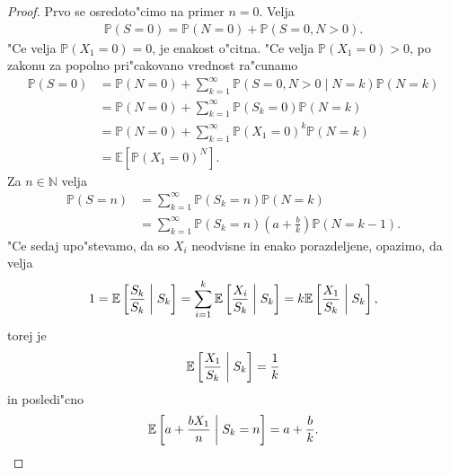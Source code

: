 \documentclass[12pt, a4paper, reqno]{amsart}
\theoremstyle{definition}
\theoremstyle{plain}
\newcommand{\N}{\mathbb{N}}
\newcommand{\E}{\mathbb{E}}
\newcommand{\Prob}{\mathbb{P}}
\newcommand{\1}{\mathds{1}}
\begin{document}
    \begin{proof}
        Prvo se osredoto"cimo na primer $n = 0$. Velja
        \begin{align*}
            \Prob\left(S = 0\right)     
                = \Prob\left(N = 0\right) + \Prob\left(S = 0, N > 0\right).
        \end{align*}
        "Ce velja $\Prob(X_1 = 0) = 0$, je enakost o"citna. "Ce 
        velja $\Prob(X_1 = 0) > 0$, po zakonu za popolno pri"cakovano vrednost ra"cunamo
        \begin{align*}
            \Prob\left(S = 0\right) 
                &= \Prob\left(N = 0\right) + \sum_{k = 1}^\infty\Prob\left(S = 0, N > 0 \mid N = k\right)\Prob\left(N = k\right) \\
                &= \Prob\left(N = 0\right) + \sum_{k = 1}^\infty\Prob\left(S_k = 0\right)\Prob\left(N = k\right) \\
                &= \Prob\left(N = 0\right) + \sum_{k = 1}^\infty\Prob\left(X_1 = 0\right)^k\Prob\left(N = k\right) \\
                &= \E\left[\Prob\left(X_1 = 0\right)^N\right].
        \end{align*}
        Za $n\in\N$ velja
        \begin{align}
            \Prob\left(S = n\right) 
                &= \sum_{k = 1}^\infty\Prob\left(S_k = n\right)\Prob\left(N = k\right) \nonumber \\
                &= \sum_{k = 1}^\infty\Prob\left(S_k = n\right)\left(a + \frac{b}{k}\right)\Prob\left(N = k - 1\right). \label{eq:PanjerRecursionSchemeProof}
        \end{align}
        "Ce sedaj upo"stevamo, da so $X_i$ neodvisne in enako porazdeljene, opazimo, da velja
        \begin{equation*}
            1 = \E\left[\frac{S_k}{S_k} \biggm|  S_k\right] = \sum_{i = 1}^k\E\left[\frac{X_i}{S_k} \biggm|  S_k\right] = k\E\left[\frac{X_1}{S_k} \biggm|  S_k\right],
        \end{equation*}
        torej je 
        \begin{equation*}
            \E\left[\frac{X_1}{S_k}  \biggm|  S_k\right] = \frac{1}{k}
        \end{equation*}
        in posledi"cno 
        \begin{equation}
            \E\left[a + \frac{bX_1}{n} \biggm|   S_k = n\right] = a + \frac{b}{k}.
            \label{eq:PanjerRecursionSchemeProof2}
        \end{equation}         

\end{proof}
\end{document}
